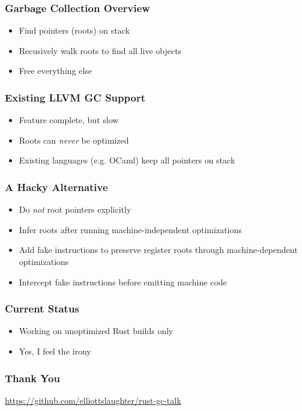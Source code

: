 \documentclass[ignorenonframetext,12pt]{beamer}
\begin{document}
\begin{frame}\frametitle{Garbage Collection Overview}
\begin{itemize}
  \item<alert@2> Find pointers (roots) on stack
  \item<alert@3> Recusively walk roots to find all live objects
  \item<alert@4> Free everything else
\end{itemize}
\end{frame}

\begin{frame}\frametitle{Existing LLVM GC Support}
\begin{itemize}
  \item Feature complete, but slow
  \item Roots can \emph{never} be optimized
  \item Existing languages (e.g. OCaml) keep all pointers on stack
\end{itemize}
\end{frame}

\begin{frame}\frametitle{A Hacky Alternative}
\begin{itemize}
  \item Do \emph{not} root pointers explicitly
  \item Infer roots after running machine-independent optimizations
  \item Add fake instructions to preserve register roots through machine-dependent optimizations
  \item Intercept fake instructions before emitting machine code
\end{itemize}
\end{frame}

\begin{frame}\frametitle{Current Status}
\begin{itemize}
  \item Working on unoptimized Rust builds only
  \item Yes, I feel the irony
\end{itemize}
\end{frame}

\begin{frame}\frametitle{Thank You}
\url{https://github.com/elliottslaughter/rust-gc-talk}
\end{frame}
\end{document}
